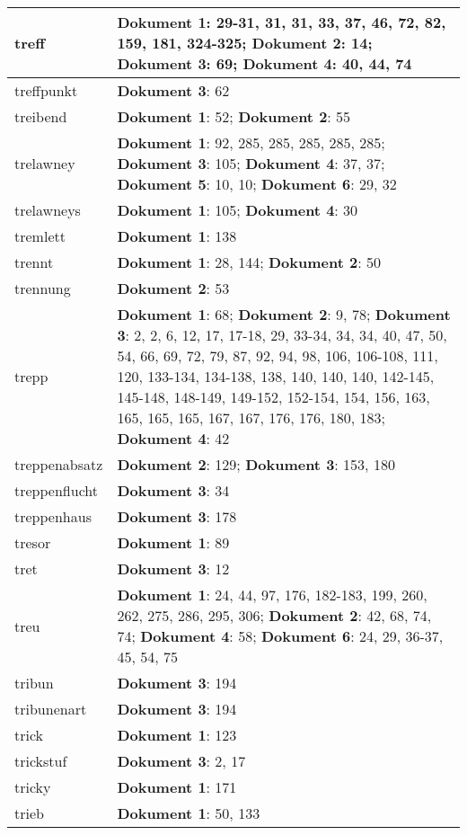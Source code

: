 \documentclass[a5paper]{article}
\begin{document}
\begin{longtable}[l]{|l|p{3in}|}
\hline
treff & \textbf{Dokument 1}: 29-31, 31, 31, 33, 37, 46, 72, 82, 159, 181, 324-325; \textbf{Dokument 2}: 14; \textbf{Dokument 3}: 69; \textbf{Dokument 4}: 40, 44, 74 \\
\hline
treffpunkt & \textbf{Dokument 3}: 62 \\
\hline
treibend & \textbf{Dokument 1}: 52; \textbf{Dokument 2}: 55 \\
\hline
trelawney & \textbf{Dokument 1}: 92, 285, 285, 285, 285, 285; \textbf{Dokument 3}: 105; \textbf{Dokument 4}: 37, 37; \textbf{Dokument 5}: 10, 10; \textbf{Dokument 6}: 29, 32 \\
\hline
trelawneys & \textbf{Dokument 1}: 105; \textbf{Dokument 4}: 30 \\
\hline
tremlett & \textbf{Dokument 1}: 138 \\
\hline
trennt & \textbf{Dokument 1}: 28, 144; \textbf{Dokument 2}: 50 \\
\hline
trennung & \textbf{Dokument 2}: 53 \\
\hline
trepp & \textbf{Dokument 1}: 68; \textbf{Dokument 2}: 9, 78; \textbf{Dokument 3}: 2, 2, 6, 12, 17, 17-18, 29, 33-34, 34, 34, 40, 47, 50, 54, 66, 69, 72, 79, 87, 92, 94, 98, 106, 106-108, 111, 120, 133-134, 134-138, 138, 140, 140, 140, 142-145, 145-148, 148-149, 149-152, 152-154, 154, 156, 163, 165, 165, 165, 167, 167, 176, 176, 180, 183; \textbf{Dokument 4}: 42 \\
\hline
treppenabsatz & \textbf{Dokument 2}: 129; \textbf{Dokument 3}: 153, 180 \\
\hline
treppenflucht & \textbf{Dokument 3}: 34 \\
\hline
treppenhaus & \textbf{Dokument 3}: 178 \\
\hline
tresor & \textbf{Dokument 1}: 89 \\
\hline
tret & \textbf{Dokument 3}: 12 \\
\hline
treu & \textbf{Dokument 1}: 24, 44, 97, 176, 182-183, 199, 260, 262, 275, 286, 295, 306; \textbf{Dokument 2}: 42, 68, 74, 74; \textbf{Dokument 4}: 58; \textbf{Dokument 6}: 24, 29, 36-37, 45, 54, 75 \\
\hline
tribun & \textbf{Dokument 3}: 194 \\
\hline
tribunenart & \textbf{Dokument 3}: 194 \\
\hline
trick & \textbf{Dokument 1}: 123 \\
\hline
trickstuf & \textbf{Dokument 3}: 2, 17 \\
\hline
tricky & \textbf{Dokument 1}: 171 \\
\hline
trieb & \textbf{Dokument 1}: 50, 133 \\

\end{longtable}
\end{document}
